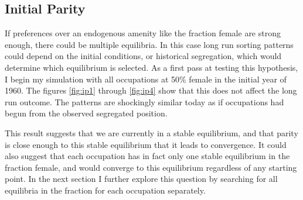 \documentclass[12pt]{article}
\begin{document}
\subsection{Initial Parity}
If preferences over an endogenous amenity like the fraction female are strong enough, there could be multiple equilibria. In this case long run sorting patterns could depend on the initial conditions, or historical segregation, which would determine which equilibrium is selected. As a first pass at testing this hypothesis, I begin my simulation with all occupations at 50\% female in the initial year of 1960. The figures \ref{fig:ip1} through \ref{fig:ip4} show that this does not affect the long run outcome. The patterns are shockingly similar today as if occupations had begun from the observed segregated position. 

This result suggests that we are currently in a stable equilibrium, and that parity is close enough to this stable equilibrium that it leads to convergence. It could also suggest that each occupation has in fact only one stable equilibrium in the fraction female, and would converge to this equilibrium regardless of any starting point. In the next section I further explore this question by searching for all equilibria in the fraction for each occupation separately.











	
\end{document}
